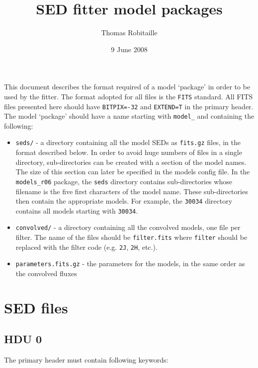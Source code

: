 \documentclass[11pt]{article}
\begin{document}
\title{SED fitter model packages}
\author{Thomas Robitaille}
\date{9 June 2008}
\maketitle

This document describes the format required of a model `package' in order to be used by the fitter. The format adopted for all files is the \texttt{FITS} standard. All FITS files presented here should have \texttt{BITPIX=-32} and \texttt{EXTEND=T} in the primary header. The model `package' should have a name starting with \texttt{model\_} and containing the following:

\begin{itemize}

\item \texttt{seds/} - a directory containing all the model SEDs as \texttt{fits.gz} files, in the format described below. In order to avoid huge numbers of files in a single directory, sub-directories can be created with a section of the model names. The size of this section can later be specified in the models config file. In the \texttt{models\_r06} package, the \texttt{seds} directory contains sub-directories whose filename is the five first characters of the model name. These sub-directories then contain the appropriate models. For example, the \texttt{30034} directory contains all models starting with \texttt{30034}.

\item \texttt{convolved/} - a directory containing all the convolved models, one file per filter. The name of the files should be \texttt{filter.fits} where \texttt{filter} should be replaced with the filter code (e.g. \texttt{2J}, \texttt{2H}, etc.).

\item \texttt{parameters.fits.gz} - the parameters for the models, in the same order as the convolved fluxes

\end{itemize}

\section{SED files}

\subsection{HDU 0}

The primary header must contain following keywords:
\end{document}
